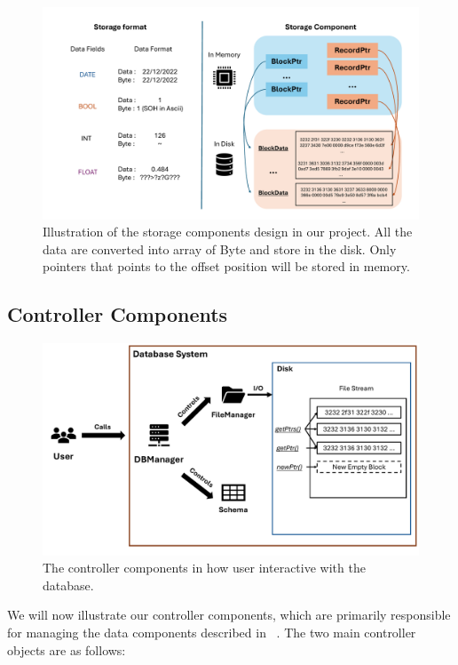 \begin{figure}[t]
    \centering
    \includegraphics[width=1\linewidth]{figures/Storage_component.pdf}
    \caption{Illustration of the storage components design in our project. All the data are converted into array of Byte and store in the disk. Only pointers that points to the offset position will be stored in memory.}
    \label{fig:storage-component}
\end{figure}


\subsection{Controller Components}
\label{subsec:controller}

\begin{figure}[t]
    \centering
    \includegraphics[width=1\linewidth]{figures/Cotroller.pdf}
    \caption{The controller components in how user interactive with the database.}
    \label{fig:Controller}
\end{figure}

We will now illustrate our controller components, which are primarily responsible for managing the data components described in ~. The two main controller objects are as follows:

